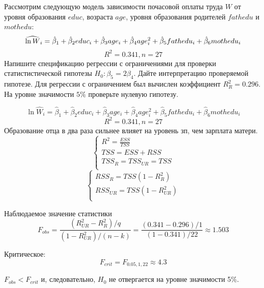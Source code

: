 \begin{problem}
Рассмотрим следующую модель зависимости почасовой оплаты труда $W$ от уровня образования $educ$, 
возраста $age$, уровня образования родителей $fathedu$ и $mothedu$:
\[
\widehat{\ln W}_i = \hat{\beta}_1 + \hat{\beta}_2 educ_i + \hat{\beta}_3 age_i + \hat{\beta}_4 age^2_i+ \hat{\beta}_5 fathedu_i + \hat{\beta}_6 mothedu_i
\]
\[
R^2 = 0.341, n = 27
\]
Напишите спецификацию регрессии с ограничениями для проверки статистистической гипотезы $H_0: \beta_5 = 2\beta_4$. 
Дайте интерпретацию проверяемой гипотезе. Для регрессии с ограничением был вычислен коэффициент $R_{R}^2 = 0.296$. 
На уровне значимости $5\%$ проверьте нулевую гипотезу.


\begin{sol}
  \[
    \ln \hat W_i = \hat{\beta}_1 + \hat{\beta}_2 educ_i + \hat{\beta}_3 age_i + \hat{\beta}_4 age^2_i + \hat{\beta}_5 fathedu_i + \hat{\beta}_6 mothedu_i
    \]
    \[
    R^2 = 0.341, n = 27
    \]
    Образование отца в два раза сильнее влияет на уровень зп, чем зарплата матери. 
    \[
    \begin{cases}
    R^2=\frac{ESS}{TSS}\\
    TSS=ESS+RSS\\
    TSS_R=TSS_{UR}=TSS\\
    \end{cases}
    \]
    \[
    \begin{cases}
    RSS_{R}=TSS(1-R^2_{R})\\
    RSS_{UR}=TSS(1-R^2_{UR})\\
    \end{cases} 
    \]
    
    Наблюдаемое значение статистики
    \[
    F_{obs}=\frac{(R_{UR}^2-R_{R}^2)/q}{(1-R^2_{UR})/(n-k)}=\frac{(0.341-0.296)/1}{(1-0.341)/22}\approx 1.503
    \]
    
    Критическое:
    \[
    F_{crit}= F_{0.05,1,22}\approx 4.3
    \]
    
    $F_{obs}<F_{crit}$ и, следовательно, $H_0$ не отвергается на уровне значимости 5\%.
\end{sol}
\end{problem}



